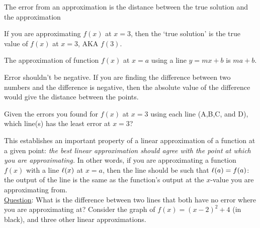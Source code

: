 \documentclass[handout,nooutcomes]{ximera}
\begin{document}
\begin{question}
\begin{hint}
The error from an approximation is the distance between the true solution and the approximation
\end{hint}
\begin{hint}
If you are approximating $f(x)$ at $x=3$, then the `true solution' is the true value of $f(x)$ at $x=3$, AKA $f(3)$.
\end{hint}
\begin{hint}
The approximation of function $f(x)$ at $x=a$ using a line $y=mx+b$ is $ma+b$.
\end{hint}
\begin{hint}
Error shouldn't be negative. If you are finding the difference
between two numbers and the difference is negative, then the absolute
value of the difference would give the distance between the points.
\end{hint}
\end{question}

\begin{question}
Given the errors you found for $f(x)$ at $x=3$ using  each line (A,B,C, and D), which line(s) has the least error at $x=3$?
\begin{selectAll}
\end{selectAll}
\end{question}

This establishes an important property of a linear approximation
of a function at a given point: {\it the best linear approximation
should agree with the point at which you are approximating.}
In other words, if you are approximating a function $f(x)$ with a
line $\ell(x)$ at $x=a$, then the line should be such that $\ell(a)=f(a)$:
the output of the line is the same as the function's output at the $x$-value you are approximating from.\\

\underline{Question}: What is the difference between two lines that both
have no error where you are approximating at?
Consider the graph of $f(x)= (x-2)^2 + 4$ (in black), and three other linear approximations.
\end{document}
